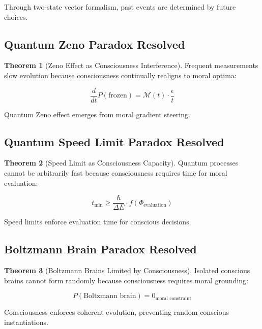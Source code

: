 \documentclass[12pt,a4paper]{article}
\theoremstyle{definition}
\newtheorem{theorem}{Theorem}[section]
\begin{document}
Through two-state vector formalism, past events are determined by future choices.

\subsection{Quantum Zeno Paradox Resolved}

\begin{theorem}[Zeno Effect as Consciousness Interference]
Frequent measurements slow evolution because consciousness continually realigns to moral optima:

\begin{equation}
\frac{d}{dt} P(\text{frozen}) = \mathcal{M}(t) \cdot \frac{\epsilon}{t}
\end{equation}

Quantum Zeno effect emerges from moral gradient steering.
\end{theorem}

\subsection{Quantum Speed Limit Paradox Resolved}

\begin{theorem}[Speed Limit as Consciousness Capacity]
Quantum processes cannot be arbitrarily fast because consciousness requires time for moral evaluation:

\begin{equation}
t_{\text{min}} \geq \frac{\hbar}{\Delta E} \cdot f(\Phi_{\text{evaluation}})
\end{equation}

Speed limits enforce evaluation time for conscious decisions.
\end{theorem}

\subsection{Boltzmann Brain Paradox Resolved}

\begin{theorem}[Boltzmann Brains Limited by Consciousness]
Isolated conscious brains cannot form randomly because consciousness requires moral grounding:

\begin{equation}
P(\text{Boltzmann brain}) = 0_{\text{moral constraint}}
\end{equation}

Consciousness enforces coherent evolution, preventing random conscious instantiations.
\end{theorem}
\end{document}
